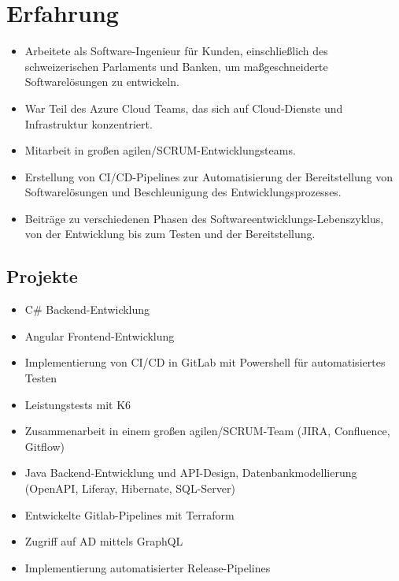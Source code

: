 \section{Erfahrung}
\begin{itemize}
    \item Arbeitete als Software-Ingenieur für Kunden, einschließlich des schweizerischen Parlaments und Banken, um maßgeschneiderte Softwarelösungen zu entwickeln.
    \item War Teil des Azure Cloud Teams, das sich auf Cloud-Dienste und Infrastruktur konzentriert.
    \item Mitarbeit in großen agilen/SCRUM-Entwicklungsteams.
    \item Erstellung von CI/CD-Pipelines zur Automatisierung der Bereitstellung von Softwarelösungen und Beschleunigung des Entwicklungsprozesses.
    \item Beiträge zu verschiedenen Phasen des Softwareentwicklungs-Lebenszyklus, von der Entwicklung bis zum Testen und der Bereitstellung.
\end{itemize}
\subsection*{Projekte}
\begin{itemize}
    \item C\# Backend-Entwicklung
    \item Angular Frontend-Entwicklung
    \item Implementierung von CI/CD in GitLab mit Powershell für automatisiertes Testen
    \item Leistungstests mit K6
\end{itemize}
\dottedline
{}
\begin{itemize}
    \item Zusammenarbeit in einem großen agilen/SCRUM-Team (JIRA, Confluence, Gitflow)
    \item Java Backend-Entwicklung und API-Design, Datenbankmodellierung (OpenAPI, Liferay, Hibernate, SQL-Server)
\end{itemize}
\dottedline
{}
\begin{itemize}
    \item Entwickelte Gitlab-Pipelines mit Terraform
    \item Zugriff auf AD mittels GraphQL
    \item Implementierung automatisierter Release-Pipelines
\end{itemize}

